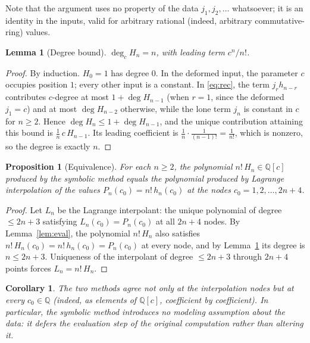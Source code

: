 \documentclass[11pt]{article}
\newtheorem{proposition}{Proposition}
\newtheorem{corollary}{Corollary}
\newtheorem{lemma}{Lemma}
\theoremstyle{remark}
\newcommand{\Q}{\mathbb{Q}}
\begin{document}
Note that the argument uses no property of the data $j_1, j_2, \dots$
whatsoever; it is an identity in the inputs, valid for arbitrary rational
(indeed, arbitrary commutative-ring) values.

\begin{lemma}[Degree bound]\label{lem:deg}
$\deg_c H_n = n$, with leading term $c^n / n!$.
\end{lemma}

\begin{proof}
By induction. $H_0 = 1$ has degree $0$. In the deformed input, the
parameter $c$ occupies position $1$; every other input is a constant.
In \eqref{eq:rec}, the term $j_r h_{n-r}$ contributes $c$-degree at most
$1 + \deg H_{n-1}$ (when $r = 1$, since the deformed $j_1 = c$) and at most
$\deg H_{n-2}$ otherwise, while the lone term $j_n$ is constant in $c$ for
$n \ge 2$. Hence $\deg H_n \le 1 + \deg H_{n-1}$, and the unique
contribution attaining this bound is $\frac{1}{n}\, c\, H_{n-1}$. Its
leading coefficient is $\frac{1}{n} \cdot \frac{1}{(n-1)!} = \frac{1}{n!}$,
which is nonzero, so the degree is exactly $n$.
\end{proof}

\begin{proposition}[Equivalence]\label{prop:main}
For each $n \ge 2$, the polynomial $n!\, H_n \in \Q[c]$ produced by the
symbolic method equals the polynomial produced by Lagrange interpolation
of the values $P_n(c_0) = n!\, h_n(c_0)$ at the nodes
$c_0 = 1, 2, \dots, 2n+4$.
\end{proposition}

\begin{proof}
Let $L_n$ be the Lagrange interpolant: the unique polynomial of degree
$\le 2n+3$ satisfying $L_n(c_0) = P_n(c_0)$ at all $2n+4$ nodes. By
Lemma~\ref{lem:eval}, the polynomial $n!\, H_n$ also satisfies
$n!\, H_n(c_0) = n!\, h_n(c_0) = P_n(c_0)$ at every node, and by
Lemma~\ref{lem:deg} its degree is $n \le 2n+3$. Uniqueness of the
interpolant of degree $\le 2n+3$ through $2n+4$ points forces
$L_n = n!\, H_n$.
\end{proof}

\begin{corollary}
The two methods agree not only at the interpolation nodes but at every
$c_0 \in \Q$ (indeed, as elements of $\Q[c]$, coefficient by coefficient).
In particular, the symbolic method introduces no modeling assumption about
the data: it defers the evaluation step of the original computation rather
than altering it.
\end{corollary}
\end{document}
